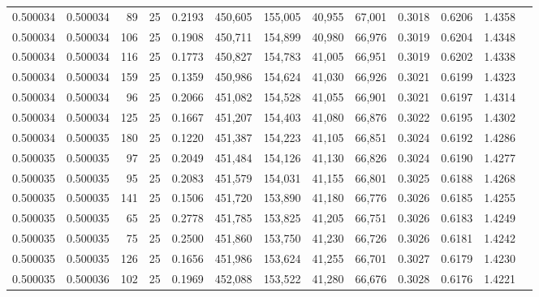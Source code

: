 \begin{tabular}{rrrrrrrrrrrrr}
0.500034 & 0.500034 &    89 &  25 &                                     0.2193 & 450,605 & 155,005 &  40,955 &  67,001 & 0.3018 & 0.6206 & 1.4358 \\
0.500034 & 0.500034 &   106 &  25 &                                     0.1908 & 450,711 & 154,899 &  40,980 &  66,976 & 0.3019 & 0.6204 & 1.4348 \\
0.500034 & 0.500034 &   116 &  25 &                                     0.1773 & 450,827 & 154,783 &  41,005 &  66,951 & 0.3019 & 0.6202 & 1.4338 \\
0.500034 & 0.500034 &   159 &  25 &                                     0.1359 & 450,986 & 154,624 &  41,030 &  66,926 & 0.3021 & 0.6199 & 1.4323 \\
0.500034 & 0.500034 &    96 &  25 &                                     0.2066 & 451,082 & 154,528 &  41,055 &  66,901 & 0.3021 & 0.6197 & 1.4314 \\
0.500034 & 0.500034 &   125 &  25 &                                     0.1667 & 451,207 & 154,403 &  41,080 &  66,876 & 0.3022 & 0.6195 & 1.4302 \\
0.500034 & 0.500035 &   180 &  25 &                                     0.1220 & 451,387 & 154,223 &  41,105 &  66,851 & 0.3024 & 0.6192 & 1.4286 \\
0.500035 & 0.500035 &    97 &  25 &                                     0.2049 & 451,484 & 154,126 &  41,130 &  66,826 & 0.3024 & 0.6190 & 1.4277 \\
0.500035 & 0.500035 &    95 &  25 &                                     0.2083 & 451,579 & 154,031 &  41,155 &  66,801 & 0.3025 & 0.6188 & 1.4268 \\
0.500035 & 0.500035 &   141 &  25 &                                     0.1506 & 451,720 & 153,890 &  41,180 &  66,776 & 0.3026 & 0.6185 & 1.4255 \\
0.500035 & 0.500035 &    65 &  25 &                                     0.2778 & 451,785 & 153,825 &  41,205 &  66,751 & 0.3026 & 0.6183 & 1.4249 \\
0.500035 & 0.500035 &    75 &  25 &                                     0.2500 & 451,860 & 153,750 &  41,230 &  66,726 & 0.3026 & 0.6181 & 1.4242 \\
0.500035 & 0.500035 &   126 &  25 &                                     0.1656 & 451,986 & 153,624 &  41,255 &  66,701 & 0.3027 & 0.6179 & 1.4230 \\
0.500035 & 0.500036 &   102 &  25 &                                     0.1969 & 452,088 & 153,522 &  41,280 &  66,676 & 0.3028 & 0.6176 & 1.4221 \\

\end{tabular}
